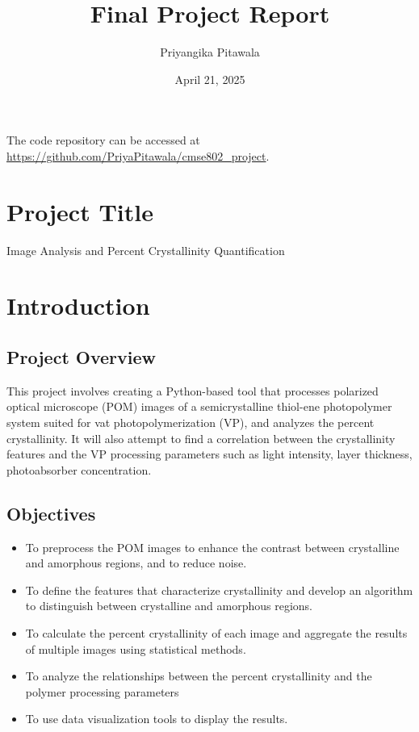 \documentclass[12pt]{article}
\title{Final Project Report}
\author{Priyangika Pitawala}
\date{April 21, 2025}
\begin{document}
\maketitle

The code repository can be accessed at \url{https://github.com/PriyaPitawala/cmse802_project}.

\section*{Project Title}
Image Analysis and Percent Crystallinity Quantification

\section{Introduction}

\subsection{Project Overview}
This project involves creating a Python-based tool that processes polarized optical microscope (POM) images of a semicrystalline
thiol-ene photopolymer system suited for vat photopolymerization (VP), and analyzes the percent crystallinity. It will also attempt to 
find a correlation between the crystallinity features and the VP processing parameters such as light intensity,
layer thickness, photoabsorber concentration.

\subsection{Objectives}
\begin{itemize}[noitemsep]
    \item To preprocess the POM images to enhance the contrast between crystalline and amorphous regions, and to reduce noise.
    \item To define the features that characterize crystallinity and develop an algorithm to distinguish between crystalline and amorphous regions.
    \item To calculate the percent crystallinity of each image and aggregate the results of multiple images using statistical methods.
    \item To analyze the relationships between the percent crystallinity and the polymer processing parameters
    \item To use data visualization tools to display the results.
    
\end{itemize}
\end{document}
